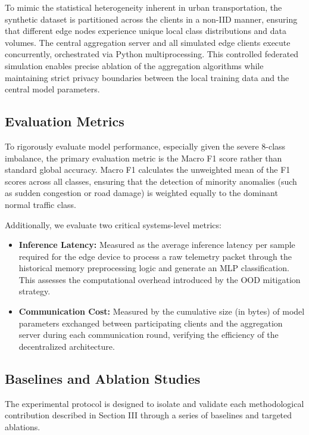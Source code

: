 To mimic the statistical heterogeneity inherent in urban transportation, the synthetic dataset is partitioned across the clients in a non-IID manner, ensuring that different edge nodes experience unique local class distributions and data volumes. The central aggregation server and all simulated edge clients execute concurrently, orchestrated via Python multiprocessing. This controlled federated simulation enables precise ablation of the aggregation algorithms while maintaining strict privacy boundaries between the local training data and the central model parameters.

\subsection{Evaluation Metrics}

To rigorously evaluate model performance, especially given the severe 8-class imbalance, the primary evaluation metric is the Macro F1 score rather than standard global accuracy. Macro F1 calculates the unweighted mean of the F1 scores across all classes, ensuring that the detection of minority anomalies (such as sudden congestion or road damage) is weighted equally to the dominant normal traffic class. 

Additionally, we evaluate two critical systems-level metrics:
\begin{itemize}
    \item \textbf{Inference Latency:} Measured as the average inference latency per sample required for the edge device to process a raw telemetry packet through the historical memory preprocessing logic and generate an MLP classification. This assesses the computational overhead introduced by the OOD mitigation strategy.
    \item \textbf{Communication Cost:} Measured by the cumulative size (in bytes) of model parameters exchanged between participating clients and the aggregation server during each communication round, verifying the efficiency of the decentralized architecture.
\end{itemize}

\subsection{Baselines and Ablation Studies}

The experimental protocol is designed to isolate and validate each methodological contribution described in Section III through a series of baselines and targeted ablations.

